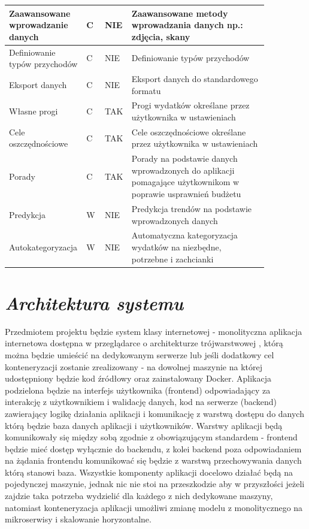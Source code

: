 \documentclass[a4paper, 10pt, twoside, openright]{report}
\newcommand{\customstylesection}[1]{\textbf{\textit{#1}}}
\begin{document}
\begin{large}
\begin{table}[H]
\begin{tabular}{|p{0.2\linewidth}|p{0.07\linewidth}|p{0.07\linewidth}|p{0.52\linewidth}|}
    \hline
    {Zaawansowane wprowadzanie danych} & {C} & {NIE} & {Zaawansowane metody wprowadzania danych np.: zdjęcia, skany}\\
    \hline
    {Definiowanie typów przychodów} & {C} & {NIE} & {Definiowanie typów przychodów}\\
    \hline
    {Eksport danych} & {C} & {NIE} & {Eksport danych do standardowego formatu}\\
    \hline
    {Własne progi} & {C} & {TAK} & {Progi wydatków określane przez użytkownika w ustawieniach}\\
    \hline
    {Cele oszczędnościowe} & {C} & {TAK} & {Cele oszczędnościowe określane przez użytkownika w ustawieniach}\\
    \hline
    {Porady} & {C} & {TAK} & {Porady na podstawie danych wprowadzonych do aplikacji 
    pomagające użytkownikom w poprawie usprawnień budżetu}\\
    \hline
    {Predykcja} & {W} & {NIE} & {Predykcja trendów na podstawie wprowadzonych danych}\\
    \hline
    {Autokategoryzacja} & {W} & {NIE} & {Automatyczna kategoryzacja wydatków na niezbędne, potrzebne i zachcianki}\\
    \hline
    \end{tabular}
\end{table}

\section{\customstylesection{Architektura systemu}}
{Przedmiotem projektu będzie system klasy internetowej - monolityczna aplikacja 
internetowa dostępna w przeglądarce o architekturze trójwarstwowej 
\cite{wzorceprojektowe}, którą można będzie umieścić na dedykowanym serwerze lub
 jeśli dodatkowy cel konteneryzacji zostanie zrealizowany - na dowolnej maszynie
 na której udostępniony będzie kod źródłowy oraz zainstalowany Docker. Aplikacja
 podzielona będzie na interfejs użytkownika (frontend) odpowiadający za 
interakcję z użytkownikiem i walidację danych, kod na serwerze (backend) 
zawierający logikę działania aplikacji i komunikację z warstwą dostępu do danych
 którą będzie baza danych aplikacji i użytkowników. Warstwy aplikacji będą 
komunikowały się między sobą zgodnie z obowiązującym standardem - frontend 
będzie mieć dostęp wyłącznie do backendu, z kolei backend poza odpowiadaniem na 
żądania frontendu komunikować się będzie z warstwą przechowywania danych którą 
stanowi baza. Wszystkie komponenty aplikacji docelowo działać będą na 
pojedynczej maszynie, jednak nic nie stoi na przeszkodzie aby w przyszłości 
jeżeli zajdzie taka potrzeba wydzielić dla każdego z nich dedykowane maszyny, 
natomiast konteneryzacja aplikacji umożliwi zmianę modelu z monolitycznego na 
mikroserwisy i skalowanie horyzontalne.}


\end{large}
\end{document}
